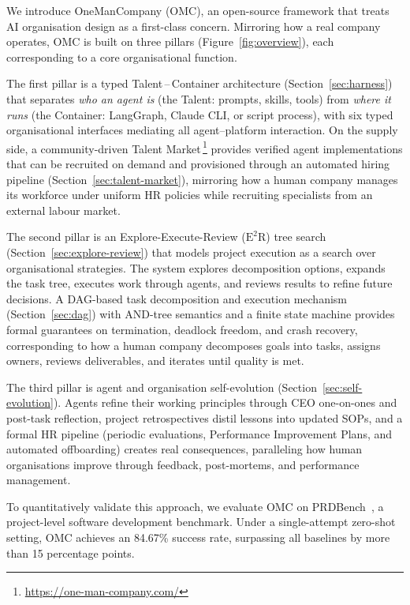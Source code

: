 \documentclass[11pt,a4paper]{article}
\begin{document}
We introduce OneManCompany (OMC), an open-source framework that treats AI organisation design as a first-class concern.  Mirroring how a real company operates, OMC is built on three pillars (Figure~\ref{fig:overview}), each corresponding to a core organisational function.

The first pillar is a typed Talent\,--\,Container architecture (Section~\ref{sec:harness}) that separates \emph{who an agent is} (the Talent: prompts, skills, tools) from \emph{where it runs} (the Container: LangGraph, Claude CLI, or script process), with six typed organisational interfaces mediating all agent--platform interaction.  On the supply side, a community-driven Talent Market\,\footnote{\url{https://one-man-company.com/}} provides verified agent implementations that can be recruited on demand and provisioned through an automated hiring pipeline (Section~\ref{sec:talent-market}), mirroring how a human company manages its workforce under uniform HR policies while recruiting specialists from an external labour market.

The second pillar is an Explore-Execute-Review ($\text{E}^2$R) tree search (Section~\ref{sec:explore-review}) that models project execution as a search over organisational strategies.  The system explores decomposition options, expands the task tree, executes work through agents, and reviews results to refine future decisions.  A DAG-based task decomposition and execution mechanism (Section~\ref{sec:dag}) with AND-tree semantics and a finite state machine provides formal guarantees on termination, deadlock freedom, and crash recovery, corresponding to how a human company decomposes goals into tasks, assigns owners, reviews deliverables, and iterates until quality is met.

The third pillar is agent and organisation self-evolution (Section~\ref{sec:self-evolution}).  Agents refine their working principles through CEO one-on-ones and post-task reflection, project retrospectives distil lessons into updated SOPs, and a formal HR pipeline (periodic evaluations, Performance Improvement Plans, and automated offboarding) creates real consequences, paralleling how human organisations improve through feedback, post-mortems, and performance management.

To quantitatively validate this approach, we evaluate OMC on PRDBench~\cite{fu2025prdbench}, a project-level software development benchmark.  Under a single-attempt zero-shot setting, OMC achieves an 84.67\% success rate, surpassing all baselines by more than 15 percentage points.
\end{document}
